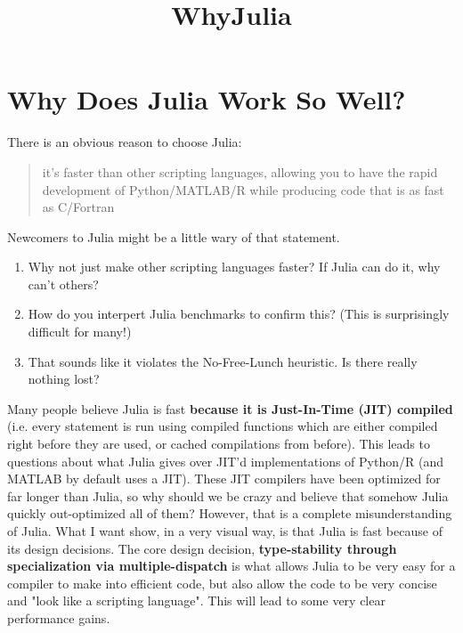 \documentclass[11pt]{article}
\title{WhyJulia}
\providecommand{\tightlist}{%
      \setlength{\itemsep}{0pt}\setlength{\parskip}{0pt}}
\begin{document}
    
    
    \maketitle
    
    

    
    \section{Why Does Julia Work So
Well?}\label{why-does-julia-work-so-well}

There is an obvious reason to choose Julia:

\begin{quote}
it's faster than other scripting languages, allowing you to have the
rapid development of Python/MATLAB/R while producing code that is as
fast as C/Fortran
\end{quote}

Newcomers to Julia might be a little wary of that statement.

\begin{enumerate}
\def\labelenumi{\arabic{enumi}.}
\tightlist
\item
  Why not just make other scripting languages faster? If Julia can do
  it, why can't others?
\item
  How do you interpert Julia benchmarks to confirm this? (This is
  surprisingly difficult for many!)
\item
  That sounds like it violates the No-Free-Lunch heuristic. Is there
  really nothing lost?
\end{enumerate}

Many people believe Julia is fast \textbf{because it is Just-In-Time
(JIT) compiled} (i.e. every statement is run using compiled functions
which are either compiled right before they are used, or cached
compilations from before). This leads to questions about what Julia
gives over JIT'd implementations of Python/R (and MATLAB by default uses
a JIT). These JIT compilers have been optimized for far longer than
Julia, so why should we be crazy and believe that somehow Julia quickly
out-optimized all of them? However, that is a complete misunderstanding
of Julia. What I want show, in a very visual way, is that Julia is fast
because of its design decisions. The core design decision,
\textbf{type-stability through specialization via multiple-dispatch} is
what allows Julia to be very easy for a compiler to make into efficient
code, but also allow the code to be very concise and "look like a
scripting language". This will lead to some very clear performance
gains.
\end{document}
